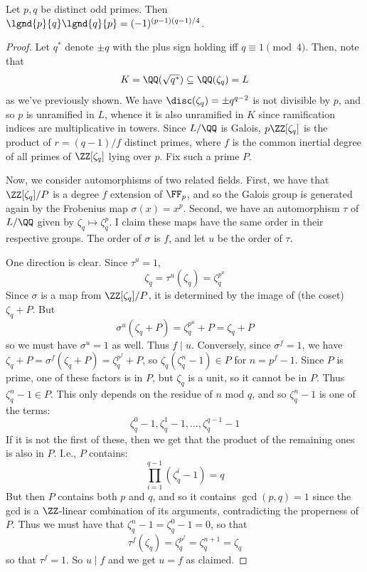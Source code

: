 \begin{thm} Let $p,q$ be distinct odd primes. Then $\lgnd{p}{q}\lgnd{q}{p} = (-1)^{(p-1)(q-1)/4}$. \end{thm}
\begin{proof}
	Let $q^\ast$ denote $\pm q$ with the plus sign holding iff $q \equiv 1 \pmod{4}$. Then, note that
	\[ K = \QQ(\sqrt{q^\ast}) \subseteq \QQ(\zeta_q) = L \]
	as we've previously shown. We have $\disc(\zeta_q) = \pm q^{q-2}$ is not divisible by $p$, and so $p$ is unramified in $L$, whence it is also unramified in $K$ since ramification indices are multiplicative in towers. Since $L/\QQ$ is Galois, $p\ZZ[\zeta_q]$ is the product of $r = (q-1)/f$ distinct primes, where $f$ is the common inertial degree of all primes of $\ZZ[\zeta_q]$ lying over $p$. Fix such a prime $P$.
	
	Now, we consider automorphisms of two related fields. First, we have that $\ZZ[\zeta_q]/P$ is a degree $f$ extension of $\FF_p$, and so the Galois group is generated again by the Frobenius map $\sigma(x) = x^p$. Second, we have an automorphism $\tau$ of $L/\QQ$ given by $\zeta_q \mapsto \zeta_q^p$. I claim these maps have the same order in their respective groups. The order of $\sigma$ is $f$, and let $u$ be the order of $\tau$.
	
	One direction is clear. Since $\tau^u = 1$,
	\[ \zeta_q = \tau^u(\zeta_q) = \zeta_q^{p^u} \]
	Since $\sigma$ is a map from $\ZZ[\zeta_q]/P$, it is determined by the image of (the coset) $\zeta_q + P$. But
	\[ \sigma^u(\zeta_q + P) = \zeta_q^{p^u} + P = \zeta_q + P \]
	so we must have $\sigma^u = 1$ as well. Thus $f \mid u$. Conversely, since $\sigma^f = 1$, we have $\zeta_q + P = \sigma^f(\zeta_q + P) = \zeta_q^{p^f}+P$, so $\zeta_q(\zeta_q^n-1) \in P$ for $n = p^f-1$. Since $P$ is prime, one of these factors is in $P$, but $\zeta_q$ is a unit, so it cannot be in $P$. Thus $\zeta_q^n-1 \in P$. This only depends on the residue of $n$ mod $q$, and so $\zeta_q^n-1$ is one of the terms:
	\[ \zeta_q^0-1,\zeta_q^1-1,\ldots,\zeta_q^{q-1}-1 \]
	If it is not the first of these, then we get that the product of the remaining ones is also in $P$. I.e., $P$ contains:
	\[ \prod_{i=1}^{q-1} (\zeta_q^i-1) = q \]
	But then $P$ contains both $p$ and $q$, and so it contains $\gcd(p,q) = 1$ since the gcd is a $\ZZ$-linear combination of its arguments, contradicting the properness of $P$. Thus we must have that $\zeta_q^n-1 = \zeta_q^0-1 = 0$, so that
	\[ \tau^f(\zeta_q) = \zeta_q^{p^f} = \zeta_q^{n+1} = \zeta_q \]
	so that $\tau^f = 1$. So $u \mid f$ and we get $u=f$ as claimed.
	

\end{proof}
